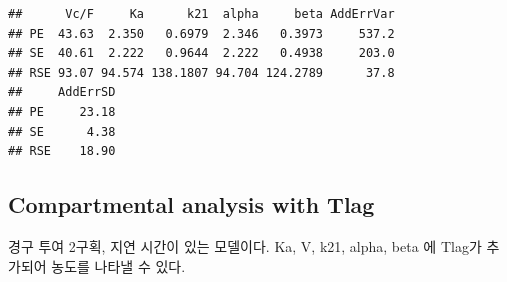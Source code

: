 \documentclass[
  11pt,
  krantz2, a4paper, twoside]{krantz}
\theoremstyle{definition}
\theoremstyle{definition}
\theoremstyle{definition}
\theoremstyle{definition}
\theoremstyle{remark}
\begin{document}
\begin{verbatim}
##      Vc/F     Ka      k21  alpha     beta AddErrVar
## PE  43.63  2.350   0.6979  2.346   0.3973     537.2
## SE  40.61  2.222   0.9644  2.222   0.4938     203.0
## RSE 93.07 94.574 138.1807 94.704 124.2789      37.8
##     AddErrSD
## PE     23.18
## SE      4.38
## RSE    18.90
\end{verbatim}

\hypertarget{compartmental-analysis-with-tlag-1}{%
\subsection{Compartmental analysis with Tlag}\label{compartmental-analysis-with-tlag-1}}

경구 투여 2구획, 지연 시간이 있는 모델이다. Ka, V, k21, alpha, beta 에 Tlag가 추가되어 농도를 나타낼 수 있다.
\end{document}
